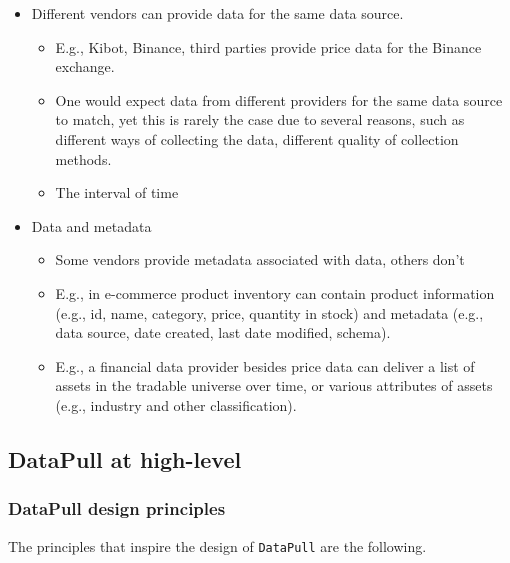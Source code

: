 \documentclass[11pt, reqno]{amsart}
\theoremstyle{definition}
\theoremstyle{remark}
\begin{document}
\begin{itemize}
\begin{itemize}
        \item Different vendors can provide data for the same data source.
          \begin{itemize}
            \item E.g., Kibot, Binance, third parties provide price data for the
              Binance exchange.

            \item One would expect data from different providers for the same data
              source to match, yet this is rarely the case due to several
              reasons, such as different ways of collecting the data, different
              quality of collection methods.

            \item The interval of time
          \end{itemize}

        \item Data and metadata
          \begin{itemize}
            \item Some vendors provide metadata associated with data, others don't

            \item E.g., in e-commerce product inventory can contain product information
              (e.g., id, name, category, price, quantity in stock) and metadata (e.g.,
              data source, date created, last date modified, schema).

            \item E.g., a financial data provider besides price data can deliver
              a list of assets in the tradable universe over time, or various
              attributes of assets (e.g., industry and other classification).
          \end{itemize}
      \end{itemize}
  \end{itemize}

  \subsection{DataPull at high-level}

  \subsubsection{DataPull design principles}
  The principles that inspire the design of \verb|DataPull| are the following.
\end{document}
